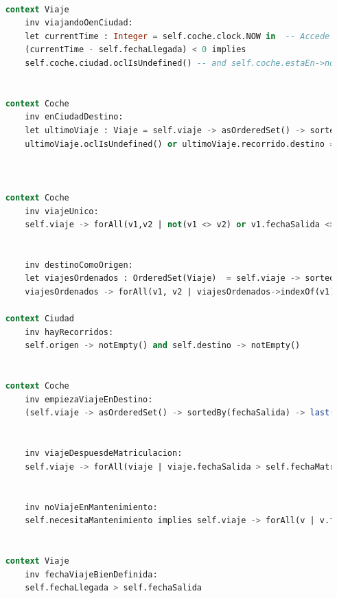\documentclass[12pt.a4paper]{article}
\begin{document}
\begin{lstlisting}[style = useNormal,language=SQL, caption={Modelo de Sistema de Coches en USE}]
    
    context Viaje
        inv viajandoOenCiudad:
        let currentTime : Integer = self.coche.clock.NOW in  -- Accede al tiempo actual
        (currentTime - self.fechaLlegada) < 0 implies
        self.coche.ciudad.oclIsUndefined() -- and self.coche.estaEn->notEmpty() -- El coche existe en una ubicacion valida
    
    
    context Coche
        inv enCiudadDestino:
        let ultimoViaje : Viaje = self.viaje -> asOrderedSet() -> sortedBy(fechaLlegada) -> last() in
        ultimoViaje.oclIsUndefined() or ultimoViaje.recorrido.destino = self.ciudad
        
    
    
    context Coche
        inv viajeUnico:
        self.viaje -> forAll(v1,v2 | not(v1 <> v2) or v1.fechaSalida <> v2.fechaSalida and (v1.fechaLlegada <= v2.fechaSalida or v2.fechaLlegada <= v1.fechaSalida))
    
    
        inv destinoComoOrigen:
        let viajesOrdenados : OrderedSet(Viaje)  = self.viaje -> sortedBy(v | v.fechaSalida) in 
        viajesOrdenados -> forAll(v1, v2 | viajesOrdenados->indexOf(v1) = viajesOrdenados->indexOf(v2) + 1 implies v1.recorrido.destino = v2.recorrido.origen)
    
    context Ciudad
        inv hayRecorridos:
        self.origen -> notEmpty() and self.destino -> notEmpty()
    
       
    context Coche
        inv empiezaViajeEnDestino:
        (self.viaje -> asOrderedSet() -> sortedBy(fechaSalida) -> last()).recorrido.destino = self.ciudad
    
    
        inv viajeDespuesdeMatriculacion:
        self.viaje -> forAll(viaje | viaje.fechaSalida > self.fechaMatriculacion)    
    
    
        inv noViajeEnMantenimiento:
        self.necesitaMantenimiento implies self.viaje -> forAll(v | v.fechaLlegada < self.clock.NOW)
    
    
    context Viaje
        inv fechaViajeBienDefinida:
        self.fechaLlegada > self.fechaSalida
    


\end{lstlisting}

\newpage
\end{document}
